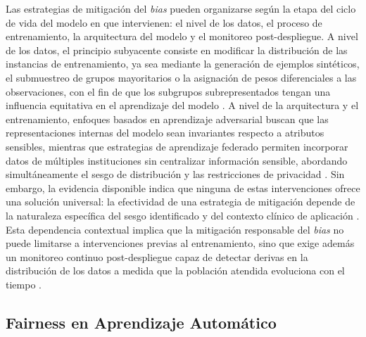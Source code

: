 Las estrategias de mitigación del \textit{bias} pueden organizarse según la etapa del ciclo de vida del modelo en que intervienen: el nivel de los datos, el proceso de entrenamiento, 
la arquitectura del modelo y el monitoreo post-despliegue. A nivel de los datos, el principio subyacente consiste en modificar la distribución de las instancias de entrenamiento, 
ya sea mediante la generación de ejemplos sintéticos, el submuestreo de grupos mayoritarios o la asignación de pesos diferenciales a las observaciones, con el fin de que los subgrupos 
subrepresentados tengan una influencia equitativa en el aprendizaje del modelo \citep{yang2024survey}. A nivel de la arquitectura y el entrenamiento, enfoques basados en aprendizaje adversarial 
buscan que las representaciones internas del modelo sean invariantes respecto a atributos sensibles, mientras que estrategias de aprendizaje federado permiten incorporar datos de múltiples 
instituciones sin centralizar información sensible, abordando simultáneamente el sesgo de distribución y las restricciones de privacidad \citep{yang2024survey}. Sin embargo, la evidencia disponible
indica que ninguna de estas intervenciones ofrece una solución universal: la efectividad de una estrategia de mitigación depende de la naturaleza específica del sesgo identificado y del contexto
clínico de aplicación \citep{mittermaier2023}. Esta dependencia contextual implica que la mitigación responsable del \textit{bias} no puede limitarse a intervenciones previas al entrenamiento, 
sino que exige además un monitoreo continuo post-despliegue capaz de detectar derivas en la distribución de los datos a medida que la población atendida evoluciona con el tiempo \citep{prenner2024}. 


\subsection{Fairness en Aprendizaje Automático}

